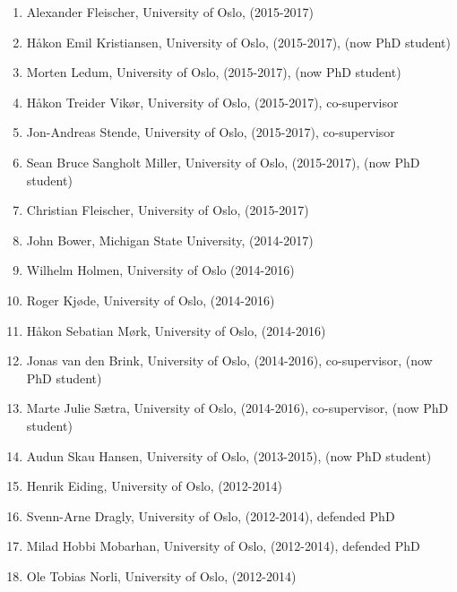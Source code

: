 \documentclass[aps,floatfix,preprint]{revtex4-1}
\begin{document}
\begin{enumerate}
\item Alexander Fleischer, University of Oslo, (2015-2017)

\item Håkon Emil Kristiansen, University of Oslo, (2015-2017),  (now PhD student)

\item Morten Ledum, University of Oslo, (2015-2017),  (now PhD student)

\item Håkon Treider Vikør, University of Oslo, (2015-2017), co-supervisor

\item Jon-Andreas Stende, University of Oslo, (2015-2017), co-supervisor

\item Sean Bruce Sangholt Miller, University of Oslo, (2015-2017),  (now PhD student)

\item Christian Fleischer, University of Oslo, (2015-2017)

\item John Bower, Michigan State University, (2014-2017)

\item Wilhelm Holmen, University of Oslo (2014-2016)

\item Roger Kjøde, University of Oslo, (2014-2016)

\item Håkon Sebatian Mørk, University of Oslo, (2014-2016)

\item Jonas van den Brink, University of Oslo, (2014-2016), co-supervisor,  (now PhD student)

\item Marte Julie Sætra, University of Oslo, (2014-2016), co-supervisor,  (now PhD student)

\item Audun Skau Hansen, University of Oslo, (2013-2015),  (now PhD student)

\item Henrik Eiding, University of Oslo, (2012-2014)

\item Svenn-Arne Dragly, University of Oslo, (2012-2014), defended PhD

\item Milad Hobbi Mobarhan, University of Oslo, (2012-2014), defended PhD

\item Ole Tobias Norli, University of Oslo, (2012-2014)


\end{enumerate}
\end{document}
